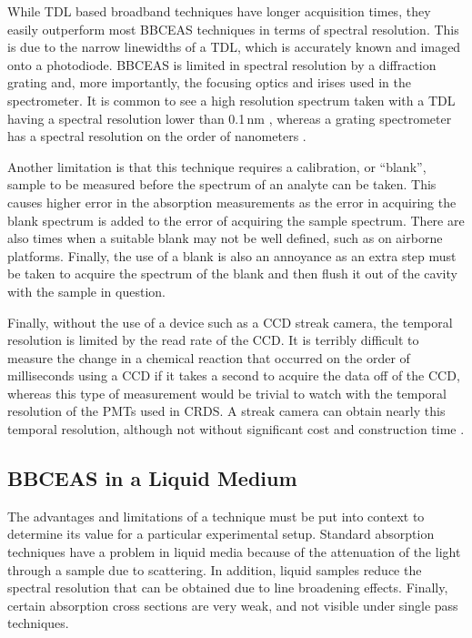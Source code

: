 
While \ac{TDL} based broadband techniques have longer acquisition times,
they easily outperform most \ac{BBCEAS} techniques in terms of spectral
resolution. This is due to the narrow linewidths of a \ac{TDL}, which is
accurately known and imaged onto a photodiode. \ac{BBCEAS} is limited in
spectral resolution by a diffraction grating and, more importantly, the
focusing optics and irises used in the spectrometer. It is common to see a
high resolution spectrum taken with a \ac{TDL} having a spectral resolution
lower than 0.1\,nm \cite{Wieman:2000vd}, whereas a grating spectrometer has a
spectral resolution on the order of nanometers \cite{Kiwanuka:2010bj}.

Another limitation is that this technique requires a calibration, or
``blank'', sample to be measured before the spectrum of an analyte can be
taken. This causes higher error in the absorption measurements as the error
in acquiring the blank spectrum is added to the error of acquiring the
sample spectrum. There are also times when a suitable blank may not be well
defined, such as on airborne platforms. Finally, the use of a blank is also an
annoyance as an extra step must be taken to acquire the spectrum of the blank
and then flush it out of the cavity with the sample in question.

Finally, without the use of a device such as a \ac{CCD} streak camera,
the temporal resolution is limited by the read rate of the \ac{CCD}.
It is terribly difficult to measure the change in a chemical reaction
that occurred on the order of milliseconds using a \ac{CCD} if it takes
a second to acquire the data off of the \ac{CCD}, whereas this type of
measurement would be trivial to watch with the temporal resolution of the
\acp{PMT} used in \ac{CRDS}. A streak camera can obtain nearly this temporal
resolution, although not without significant cost and construction time
\cite{Velten:2011vq}.



\subsection{BBCEAS in a Liquid Medium}\label{subsec:bbceas_liq}

The advantages and limitations of a technique must be put into context to
determine its value for a particular experimental setup. Standard absorption
techniques have a problem in liquid media because of the attenuation of the
light through a sample due to scattering. In addition, liquid samples reduce
the spectral resolution that can be obtained due to line broadening effects.
Finally, certain absorption cross sections are very weak, and not visible
under single pass techniques.

